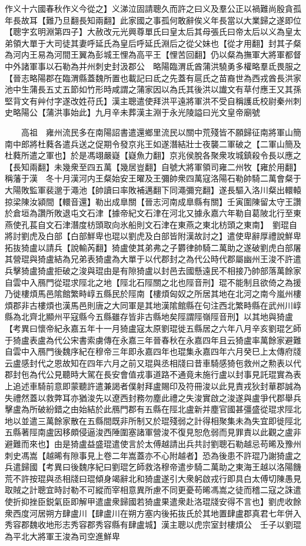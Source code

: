 作义十六國春秋作义今從之】义涕泣固請聰久而許之曰义及羣公正以禍難尚殷貪孤年長故耳【難乃旦翻長知兩翻】此家國之事孤何敢辭俟义年長當以大業歸之遂即位【聰字玄明淵第四子】大赦改元光興尊單氏曰皇太后其母張氏曰帝太后以义為皇太弟領大單于大司徒其妻呼延氏為皇后呼延氏淵后之從父妹也【從才用翻】封其子粲為河内王易為河間王翼為彭城王悝為高平王【悝苦回翻】仍以粲為撫軍大將軍都督中外諸軍事以石勒為并州刺史封汲郡公　略陽臨渭氐酋蒲洪驍勇多權略羣氐畏服之【晉志略陽郡在臨渭縣蓋魏所置也載記曰氐之先蓋有扈氏之苗裔世為西戎酋長洪家池中生蒲長五丈五節如竹形時咸謂之蒲家因以為氏其後洪以䜟文有草付應王又其孫堅背文有艸付字遂改姓苻氏】漢主聰遣使拜洪平遠將軍洪不受自稱護氐校尉秦州刺史略陽公【蒲洪事始此】九月辛未葬漢主淵于永光陵謚曰光文皇帝廟號

　　高祖　雍州流民多在南陽詔書遣還鄉里流民以關中荒殘皆不願歸征南將軍山簡南中郎將杜蕤各遣兵送之促期令發京兆王如遂潛結壯士夜襲二軍破之【二軍山簡及杜蕤所遣之軍也】於是馮翊嚴嶷【嶷魚力翻】京兆侯脫各聚衆攻城鎮殺令長以應之【長知兩翻】未幾衆至四五萬【幾居豈翻】自號大將軍領司雍二州牧【雍於用翻】稱藩于漢　冬十月漢河内王粲始安王曜及王彌帥衆四萬寇洛陽石勒帥騎二萬會粲于大陽敗監軍裴邈于澠池【帥讀曰率敗補邁翻下同澠彌兖翻】遂長驅入洛川粲出轘轅掠梁陳汝潁間【轘音還】勒出成臯關【晉志河南成臯縣有關】壬寅圍陳留太守王讚於倉垣為讚所敗退屯文石津【據帝紀文石津在河北又據永嘉六年勒自葛陂北行至東燕使孔萇自文石津潛度枋頭取向氷船則文石津在東燕之東北枋頭之東南】　劉琨自將討劉虎及白部【白部鮮卑也琨以劉虎及白部皆附漢故討之】遣使卑辭厚禮說鮮卑拓抜猗盧以請兵【說輸芮翻】猗盧使其弟弗之子欝律帥騎二萬助之遂破劉虎白部屠其營琨與猗盧結為兄弟表猗盧為大單于以代郡封之為代公時代郡屬幽州王浚不許遣兵擊猗盧猗盧拒破之浚與琨由是有隙猗盧以封邑去國懸遠民不相接乃帥部落萬餘家自雲中入鴈門從琨求陘北之地【陘北石陘關之北也陘音刑】琨不能制且欲倚之為援乃徙樓煩馬邑隂館繁畤崞五縣民於陘南【樓煩匈奴之所居其地在北河之南今嵐州樓煩郡非古樓煩也漢馬邑則唐之大同軍是其地漢隂館縣在句注西北繁畤縣在武州川崞縣為北齊北顯州平寇縣今五縣雖存皆非古縣地矣陘謂陘嶺陘音刑】以其地與猗盧【考異曰懷帝紀永嘉五年十一月猗盧寇太原劉琨徙五縣居之六年八月辛亥劉琨乞師于猗盧表盧為代公宋書索虜傳在永嘉三年晉春秋在永嘉四年且云猗盧率萬餘家避難自雲中入鴈門後魏序紀在穆帝三年即永嘉四年也琨集永嘉四年六月癸巳上太傳府牋云盧感封代之恩故知在四年六月之前又琨與丞相牋曰昔車騎感猗㐌救州之勲表以代郡封㐌為代公見聽時大駕在長安會值戎事道路不通竟未施行盧以封事見託琨實為表上追述車騎前意即蒙聽許遣兼謁者僕射拜盧賜印及符冊浚以此見責戎狄封華郡誠為失禮然蓋以救弊耳亦猶浚先以遼西封務勿塵此禮之失浚實啟之浚遂與盧爭代郡舉兵擊盧為所破紛錯之由始結於此鴈門郡有五縣在陘北盧新并塵官國甚彊盛從琨求陘北地以並遣三萬餘家散在五縣間既非所制又於琨殘弱之計得相聚集未為失宜即徙陘北五縣著陘南盧因移頗侵逼浚西陲圍塞諸軍營浚不復見恕危弱而見罪責以此觀之盧非避難而來也】由是猗盧益盛琨遣使言於太傅越請出兵共討劉聰石勒越忌苟晞及豫州刺史馮嵩【越晞有隙事見上卷二年嵩蓋亦不心附越者】恐為後患不許琨乃謝猗盧之兵遣歸國【考異曰後魏序紀曰劉琨乞師救洛穆帝遣步騎二萬助之東海王越以洛陽饑荒不許按琨與丞相牋曰琨傾身竭辭北和猗盧遂引大衆躬啟戎行即具白太傅切陳愚見取賊之計聰宜時討勒不可縱而宰相意異所慮不同更憂苟晞馮嵩之徒而稽二寇之誅遣使折抑挫臣鋭氣臣即解甲遣盧衆歸國若猗盧果遣衆赴洛琨牋安得不言也】劉虎收餘衆西度河居朔方肆盧川【肆盧川在朔方塞内後拓抜氏於其地置肆盧郡真君七年併入秀容郡魏收地形志秀容郡秀容縣有肆盧城】漢主聰以虎宗室封樓煩公　壬子以劉琨為平北大將軍王浚為司空進鮮卑